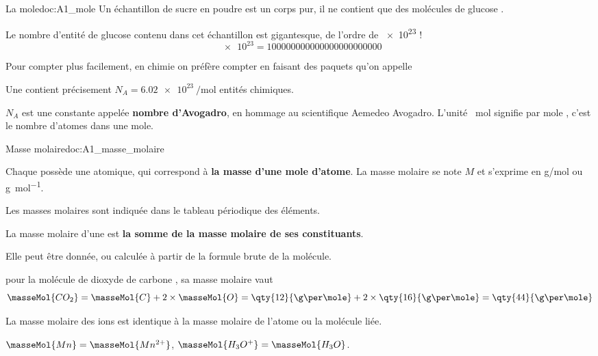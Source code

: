 \begin{doc}{La mole}{doc:A1_mole}
  Un échantillon de sucre en poudre est un corps pur, il ne contient que des molécules de glucose .

  Le nombre d'entité de glucose contenu dans cet échantillon est gigantesque, de l'ordre de \num{e23} !
  \begin{equation*}
    \num{e23} = \num{100 000 000 000 000 000 000 000}
  \end{equation*}

  Pour compter plus facilement, en chimie on préfère compter en faisant des paquets qu'on appelle 

  \begin{encart}
    Une  contient précisement $N_A = \qty{6,02 e23}{\per\mole}$ entités chimiques.
  \end{encart}
  \attention $N_A$ est une constante appelée \textbf{nombre d'Avogadro}, en hommage au scientifique Aemedeo Avogadro.
  L'unité \og \unit{\per\mole} \fg\! signifie \og par mole \fg, c’est le nombre d'atomes dans une mole.
\end{doc}

\begin{doc}{Masse molaire}{doc:A1_masse_molaire}
  \begin{encart}
    Chaque  possède une  atomique, qui correspond à \textbf{la masse d'une mole d'atome}.
    La masse molaire se note $M$ et s'exprime en \unit{\g/\mole} ou \unit{\g\per\mole}.
  \end{encart}
  Les masses molaires sont indiquée dans le tableau périodique des éléments.


  \begin{encart}
    La masse molaire d'une  est \textbf{la somme de la masse molaire de ses constituants}.
  \end{encart}
  Elle peut être donnée, ou calculée à partir de la formule brute de la molécule.

  \exemple pour la molécule de dioxyde de carbone , sa masse molaire vaut
  \begin{equation*}
    \masseMol{CO_2} = \masseMol{C} + 2 \times \masseMol{O}
    = \qty{12}{\g\per\mole} + 2\times\qty{16}{\g\per\mole}
    = \qty{44}{\g\per\mole}
  \end{equation*}

  \begin{encart}
    La masse molaire des ions est identique à la masse molaire de l'atome ou la molécule liée.
  \end{encart}

  \exemples $\masseMol{Mn} = \masseMol{Mn^{2+}}$,
  $\masseMol{H_3O^{+}} = \masseMol{H_3O}$.
\end{doc}


